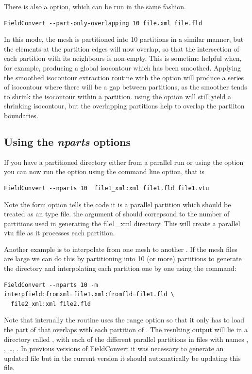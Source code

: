 There is also a  option, which can be run in the
same fashion.
\begin{lstlisting}[style=BashInputStyle]
FieldConvert --part-only-overlapping 10 file.xml file.fld
\end{lstlisting}
In this mode, the mesh is partitioned into 10 partitions in a similar manner,
but the elements at the partition edges will now overlap, so that the
intersection of each partition with its neighbours is non-empty. This is
sometime helpful when, for example, producing a global isocontour which has been
smoothed. Applying the smoothed isocontour extraction routine with the
 option will produce a series of isocontour where there will
be a gap between partitions, as the smoother tends to shrink the isocontour
within a partition. using the  option will still
yield a shrinking isocontour, but the overlapping partitions help to overlap the
partiiton boundaries.

\subsection{Using the \textit{nparts} options}

If you have a partitioned directory either from a parallel run or
using the  option you can now run the
 option using the   command line
option, that is
\begin{lstlisting}[style=BashInputStyle]
FieldConvert --nparts 10  file1_xml:xml file1.fld file1.vtu
\end{lstlisting}

Note the form  option tells the code it is a
parallel partition which should be treated as an  type
file. the argument of  should correpsond to the number
of partitions used in generating the file1\_xml directory. This will
create a parallel vtu file as it processes each partition.


Another example is to interpolate  from one mesh
 to another . If the mesh files are
large we can do this by partitioning  into 10 (or
more) partitions to generate the  directory and
interpolating each partition one by one using the command:
\begin{lstlisting}[style=BashInputStyle]
  FieldConvert --nparts 10 -m interpfield:fromxml=file1.xml:fromfld=file1.fld \
  file2_xml:xml file2.fld
\end{lstlisting}
Note that internally the routine uses the range option so that it only
has to load the part of \inltt{file1.xml} that overlaps with each
partition of \inltt{file2.xml}.  The resulting output will lie in a
directory called \inltt{file2.fld}, with each of the different
parallel partitions in files with names ,
, \dots, . In previous
versions of FieldConvert it was necessary to generate an updated
\inltt{Info.xml} file but in the current version it should
automatically be updating this file.

